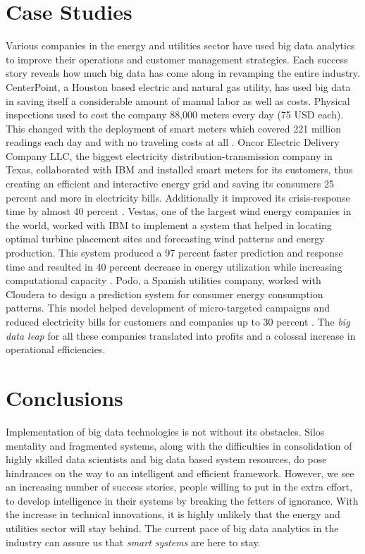 \section{Case Studies}
Various companies in the energy and utilities sector have used big data analytics to improve their operations and customer management strategies. Each success story reveals how much big data has come along in revamping the entire industry. CenterPoint, a Houston based electric and natural gas utility, has used big data in saving itself a considerable amount of manual labor as well as costs. Physical inspections used to cost the company 88,000 meters every day (75 USD each). This changed with the deployment of smart meters which covered 221 million readings each day and with no traveling costs at all \cite{wharton04}. Oncor Electric Delivery Company LLC, the biggest electricity distribution-transmission company in Texas, collaborated with IBM and installed smart meters for its customers, thus creating an efficient and interactive energy grid and saving its consumers 25 percent and more in electricity bills. Additionally it improved its crisis-response time by almost 40 percent \cite{oncor19}. Vestas, one of the largest wind energy companies in the world, worked with IBM to implement a system that helped in locating optimal turbine placement sites and forecasting wind patterns and energy production. This system produced a 97 percent faster prediction and response time and resulted in 40 percent decrease in energy utilization while increasing computational capacity \cite{vestas21}. Podo, a Spanish utilities company, worked with Cloudera to design a prediction system for consumer energy consumption patterns. This model helped development of micro-targeted campaigns and reduced electricity bills for customers and companies up to 30 percent \cite{cloud20}. The {\em big data leap} for all these companies translated into profits and a colossal increase in operational efficiencies.

\section{Conclusions}
Implementation of big data technologies is not without its obstacles. Silos mentality and fragmented systems, along with the difficulties in consolidation of highly skilled data scientists and big data based system resources, do pose hindrances on the way to an intelligent and efficient framework. However, we see an increasing number of success stories, people willing to put in the extra effort, to develop intelligence in their systems by breaking the fetters of ignorance. With the increase in technical innovations, it is highly unlikely that the energy and utilities sector will stay behind. The current pace of big data analytics in the industry can assure us that {\em smart systems} are here to stay. 



